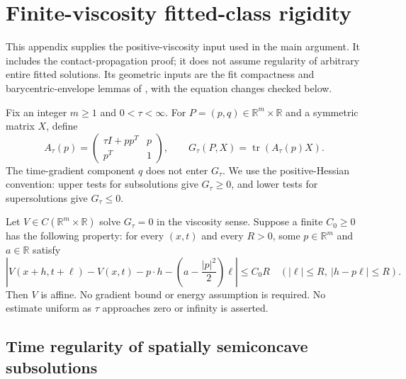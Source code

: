 \section{Finite-viscosity fitted-class rigidity}\label{app:viscous}

This appendix supplies the positive-viscosity input used in the main
argument. It includes the contact-propagation proof; it does not assume
regularity of arbitrary entire fitted solutions. Its geometric inputs
are the fit compactness and barycentric-envelope lemmas of
\cite[Sections 4--5]{OpenAI}, with the equation changes checked below.

Fix an integer $m\geq1$ and $0<\tau<\infty$. For $P=(p,q)\in
\mathbb R^m\times\mathbb R$ and a symmetric matrix $X$, define
\[
 A_\tau(p)=\begin{pmatrix}\tau I+pp^T&p\\p^T&1\end{pmatrix},
 \qquad G_\tau(P,X)=\operatorname{tr}(A_\tau(p)X).
\]
The time-gradient component $q$ does not enter $G_\tau$. We use the
positive-Hessian convention: upper tests for subsolutions give
$G_\tau\geq0$, and lower tests for supersolutions give $G_\tau\leq0$.

\begin{theorem}\label{thm:viscous}
Let $V\in C(\mathbb R^m\times\mathbb R)$ solve $G_\tau=0$ in the
viscosity sense. Suppose a finite $C_0\geq0$ has the following property:
for every $(x,t)$ and every $R>0$, some $p\in\mathbb R^m$ and
$a\in\mathbb R$ satisfy
\begin{equation}\label{eq:app-fit}
 \left|V(x+h,t+\ell)-V(x,t)-p\cdot h
       -\left(a-\frac{|p|^2}{2}\right)\ell\right|\leq C_0R
 \quad (|\ell|\leq R,\ |h-p\ell|\leq R).
\end{equation}
Then $V$ is affine. No gradient bound or energy assumption is required.
No estimate uniform as $\tau$ approaches zero or infinity is asserted.
\end{theorem}

\subsection{Time regularity of spatially semiconcave subsolutions}

